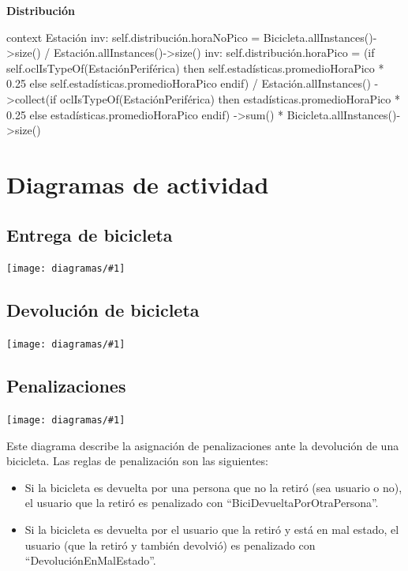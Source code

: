 \documentclass[a4paper, 10pt, twoside]{article}
\newcommand{\diagramav}[1]{
  \texttt{[image: diagramas/\#1]}
}
\newenvironment{ocl}[1]
  {
    \textbf{#1}
    \verbatim
  }{
    \endverbatim
  }
\begin{document}
\begin{ocl}{Distribución}
  context Estación
  inv: self.distribución.horaNoPico =
           Bicicleta.allInstances()->size() /
           Estación.allInstances()->size()
  inv: self.distribución.horaPico =
           (if self.oclIsTypeOf(EstaciónPeriférica) then
               self.estadísticas.promedioHoraPico * 0.25
           else
               self.estadísticas.promedioHoraPico
           endif) /
           Estación.allInstances()
               ->collect(if oclIsTypeOf(EstaciónPeriférica) then
                             estadísticas.promedioHoraPico * 0.25
                         else
                             estadísticas.promedioHoraPico
                         endif)
               ->sum() *
           Bicicleta.allInstances()->size()
\end{ocl}




\section{Diagramas de actividad}


\subsection{Entrega de bicicleta}

\diagramav{da-entrega-bicicleta}


\subsection{Devolución de bicicleta}

\diagramav{da-devolucion-bicicleta}


\subsection{Penalizaciones}

\diagramav{da-penalizaciones}

Este diagrama describe la asignación de penalizaciones ante la devolución de una bicicleta. Las reglas de penalización son las siguientes:

\begin{itemize}
  \item Si la bicicleta es devuelta por una persona que no la retiró (sea usuario o no), el usuario que la retiró es penalizado con ``BiciDevueltaPorOtraPersona''.

  \item Si la bicicleta es devuelta por el usuario que la retiró y está en mal estado, el usuario (que la retiró y también devolvió) es penalizado con ``DevoluciónEnMalEstado''.
\end{itemize}
\end{document}
